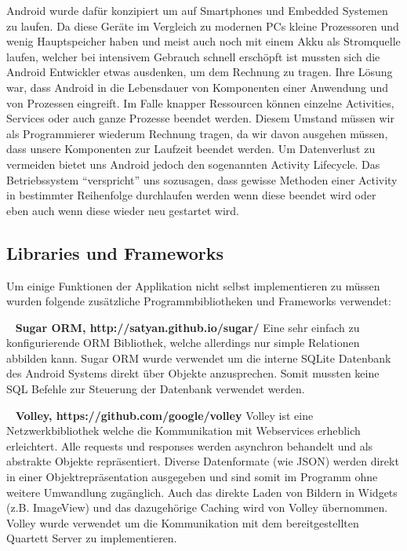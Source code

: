 \documentclass{scrartcl}
\begin{document}
Android wurde dafür konzipiert um auf Smartphones und Embedded Systemen zu
laufen. Da diese Geräte im Vergleich zu modernen PCs kleine Prozessoren und
wenig Hauptspeicher haben und meist auch noch mit einem Akku als Stromquelle
laufen, welcher bei intensivem Gebrauch schnell erschöpft ist mussten sich die
Android Entwickler etwas ausdenken, um dem Rechnung zu tragen. Ihre Lösung war,
dass Android in die Lebensdauer von Komponenten einer Anwendung und von
Prozessen eingreift. Im Falle knapper Ressourcen können einzelne Activities,
Services oder auch ganze Prozesse beendet werden. Diesem Umstand müssen wir als
Programmierer wiederum Rechnung tragen, da wir davon ausgehen müssen, dass
unsere Komponenten zur Laufzeit beendet werden. Um Datenverlust zu vermeiden
bietet uns Android jedoch den sogenannten Activity Lifecycle. Das Betriebssystem
\enquote{verspricht} uns sozusagen, dass gewisse Methoden einer Activity in
bestimmter Reihenfolge durchlaufen werden wenn diese beendet wird oder eben auch
wenn diese wieder neu gestartet wird.

\subsection{Libraries und Frameworks}
Um einige Funktionen der Applikation nicht selbst implementieren zu müssen
wurden folgende zusätzliche Programmbibliotheken und Frameworks verwendet:

\noindent
\ \newline
\textbf{Sugar ORM, http://satyan.github.io/sugar/} \newline
Eine sehr einfach zu konfigurierende ORM Bibliothek, welche allerdings nur
simple Relationen abbilden kann. Sugar ORM wurde verwendet um die interne SQLite
Datenbank des Android Systems direkt über Objekte anzusprechen. Somit mussten
keine SQL Befehle zur Steuerung der Datenbank verwendet werden.

\ \newline
\textbf{Volley, https://github.com/google/volley} \newline
Volley ist eine Netzwerkbibliothek welche die Kommunikation mit Webservices
erheblich erleichtert. Alle requests und responses werden asynchron behandelt
und als abstrakte Objekte repräsentiert. Diverse Datenformate (wie JSON) werden
direkt in einer Objektrepräsentation ausgegeben und sind somit im Programm ohne
weitere Umwandlung zugänglich. Auch das direkte Laden von Bildern in Widgets
(z.B. ImageView) und das dazugehörige Caching wird von Volley übernommen. Volley
wurde verwendet um die Kommunikation mit dem bereitgestellten Quartett Server zu
implementieren.
\end{document}
